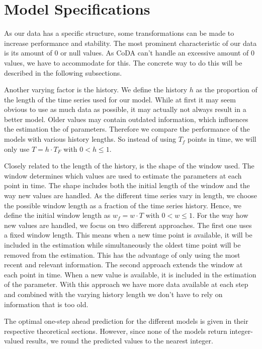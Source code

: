 \section{Model Specifications}
\label{sec: Model Specification}

As our data has a specific structure, some transformations can be made to increase performance and stability. The most prominent characteristic of our data is its amount of 0 or null values. As CoDA can't handle an excessive amount of 0 values, we have to accommodate for this. The concrete way to do this will be described in the following subsections. 

Another varying factor is the history. We define the history $h$ as the proportion of the length of the time series used for our model. While at first it may seem obvious to use as much data as possible, it may actually not always result in a better model. Older values may contain outdated information, which influences the estimation the of parameters. Therefore we compare the performance of the models with various history lengths. So instead of using $T_f$ points in time, we will only use $T=h\cdot T_F$ with $0 < h \leq 1$. 

Closely related to the length of the history, is the shape of the window used. The window determines which values are used to estimate the parameters at each point in time. The shape includes both the initial length of the window and the way new values are handled. As the different time series vary in length, we choose the possible window length as a fraction of the time series history. Hence, we define the initial window length as $w_f=w \cdot T$ with $0 < w \leq 1$. For the way how new values are handled, we focus on two different approaches. The first one uses a fixed window length. This means when a new time point is available, it will be included in the estimation while simultaneously the oldest time point will be removed from the estimation. This has the advantage of only using the most recent and relevant information. The second approach extends the window at each point in time. When a new value is available, it is included in the estimation of the parameter. With this approach we have more data available at each step and combined with the varying history length we don't have to rely on information that is too old.

The optimal one-step ahead prediction for the different models is given in their respective theoretical sections. However, since none of the models return integer-valued results, we round the predicted values to the nearest integer. 

